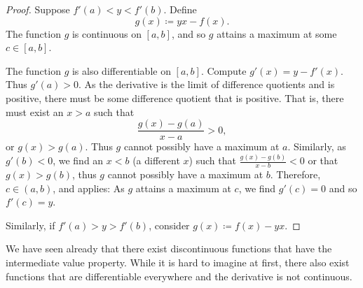 \begin{proof}
Suppose 
$f'(a) < y < f'(b)$.
Define
\begin{equation*}
g(x) \coloneqq yx - f(x) .
\end{equation*}
The function $g$ is continuous on $[a,b]$, and so $g$ attains a maximum at some $c \in
[a,b]$.

The function $g$ is also differentiable on $[a,b]$.
Compute $g'(x) = y-f'(x)$.  Thus $g'(a) > 0$.  As the derivative is
the limit of difference quotients and is positive, there must be some
difference quotient that is positive.  That is, there must exist
an $x > a$ such that
\begin{equation*}
\frac{g(x)-g(a)}{x-a} > 0 ,
\end{equation*}
or $g(x) > g(a)$.  Thus $g$
cannot possibly have a maximum at $a$.  Similarly, as $g'(b) < 0$,
we find an $x < b$ (a different $x$) such that
$\frac{g(x)-g(b)}{x-b} < 0$ or that $g(x) > g(b)$, thus
$g$ cannot possibly have a maximum at $b$.
Therefore, $c \in (a,b)$,
and  applies: As $g$ attains a maximum
at $c$, we find $g'(c) = 0$
and so $f'(c) = y$.

Similarly, if $f'(a) > y > f'(b)$, consider $g(x) \coloneqq f(x)- yx$.
\end{proof}

We have seen already that
there exist discontinuous functions that have the
intermediate value property.  While it is hard to imagine at first, there
also
exist functions that are differentiable everywhere and the derivative is not
continuous.

